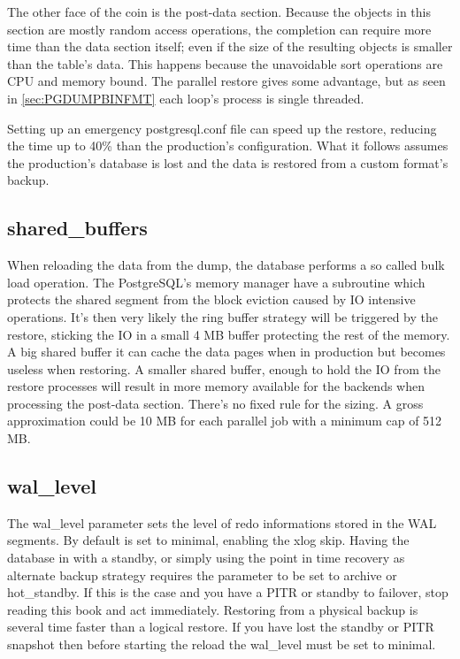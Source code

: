 The other face of the coin is the post-data section. Because the objects in this section are mostly 
random access operations, the completion can require more time than the data section itself; even 
if the size of the resulting objects is smaller than the table's data. This happens because the 
unavoidable sort operations are CPU and memory bound. The parallel restore gives some advantage, 
but as seen in \ref{sec:PGDUMPBINFMT} each loop's process is single threaded. \newline

Setting up an emergency postgresql.conf file can speed up the restore, reducing the time up to 40\% 
than the production's configuration. What it follows assumes the production's database is lost and 
the data is restored from a custom format's backup. 

\subsection{shared\_buffers}
When reloading the data from the dump, the database performs a so called bulk load operation. The 
PostgreSQL's memory manager have a subroutine which protects the shared segment from the block 
eviction caused by IO intensive operations. It's then very likely the ring buffer strategy will be 
triggered by the restore, sticking the IO in a small 4 MB buffer protecting the rest of the memory. 
A big shared buffer it can cache the data pages when in production but becomes useless when 
restoring. A smaller shared buffer, enough to hold the IO from  the restore processes will result 
in more memory available for the backends when processing the post-data section. There's no fixed 
rule for the sizing. A gross approximation could be 10 MB for each parallel job with a minimum cap 
of 512 MB.   

\subsection{wal\_level}
The wal\_level parameter sets the level of redo informations stored in the WAL segments. By default 
is set to minimal, enabling the xlog skip. Having the database in with a standby, or simply using 
the point in time recovery as alternate backup strategy requires the parameter to be set to archive 
or hot\_standby. If this is the case and you have a PITR or standby to failover, stop reading 
this book and act immediately. Restoring from a physical backup is several time faster than a 
logical restore. If you have lost the standby or PITR snapshot then before starting the reload the 
wal\_level must be set to minimal.

